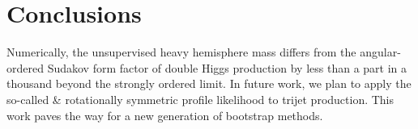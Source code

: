 \section{Conclusions}\label{sec:conclusions}

Numerically, the unsupervised heavy hemisphere mass differs from the
angular-ordered Sudakov form factor of double Higgs production by less
than a part in a thousand beyond the strongly ordered limit. In future
work, we plan to apply the so-called & rotationally symmetric profile
likelihood to trijet production. This work paves the way for a new
generation of bootstrap methods.

